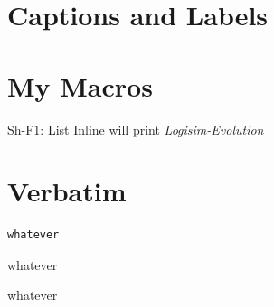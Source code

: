 \section{Captions and Labels}

\section{My Macros}
Sh-F1: List Inline
\Le will print \textit{Logisim-Evolution}

\section{Verbatim}
\begin{Verbatim}[commandchars=~\[\], samepage=true]
whatever
\end{Verbatim}

\begin{binDisp} %
whatever
\end{binDisp}

\begin{lineDisp} %
whatever
\end{lineDisp}



